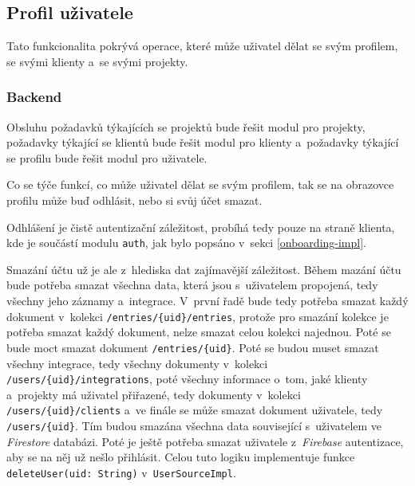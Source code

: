 \subsection{Profil uživatele}

Tato funkcionalita pokrývá operace, které může uživatel dělat se svým profilem, se svými klienty a~se svými projekty. 

\subsubsection{Backend}

Obsluhu požadavků týkajících se projektů bude řešit modul pro projekty, požadavky týkající se klientů bude řešit modul pro klienty a~požadavky týkající se profilu bude řešit modul pro uživatele.

Co se týče funkcí, co může uživatel dělat se svým profilem, tak se na obrazovce profilu může buď odhlásit, nebo si svůj účet smazat.

Odhlášení je čistě autentizační záležitost, probíhá tedy pouze na straně klienta, kde je součástí modulu \texttt{auth}, jak bylo popsáno v~sekci \ref{onboarding-impl}.

Smazání účtu už je ale z~hlediska dat zajímavější záležitost. Během mazání účtu bude potřeba smazat všechna data, která jsou s~uživatelem propojená, tedy všechny jeho záznamy a~integrace. V~první řadě bude tedy potřeba smazat každý dokument v~kolekci \texttt{/entries/\{uid\}/entries}, protože pro smazání kolekce je potřeba smazat každý dokument, nelze smazat celou kolekci najednou. Poté se bude moct smazat dokument \texttt{/entries/\{uid\}}. Poté se budou muset smazat všechny integrace, tedy všechny dokumenty v~kolekci \texttt{/users/\{uid\}/integrations}, poté všechny informace o~tom, jaké klienty a~projekty má uživatel přiřazené, tedy dokumenty v~kolekci \texttt{/users/\{uid\}/clients} a~ve finále se může smazat dokument uživatele, tedy \texttt{/users/\{uid\}}. Tím budou smazána všechna data související s~uživatelem ve \emph{Firestore} databázi. Poté je ještě potřeba smazat uživatele z~\emph{Firebase} autentizace, aby se na něj už nešlo přihlásit. Celou tuto logiku implementuje funkce \texttt{deleteUser(uid: String)} v~\texttt{UserSourceImpl}.

